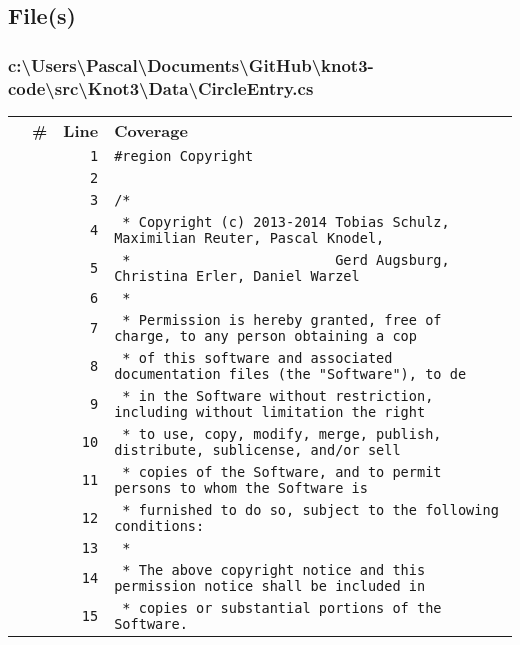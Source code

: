 \documentclass[a4paper,10pt]{article}
\begin{document}
\subsection{File(s)}
\subsubsection{c:\textbackslash Users\textbackslash Pascal\textbackslash Documents\textbackslash GitHub\textbackslash knot3-code\textbackslash src\textbackslash Knot3\textbackslash Data\textbackslash CircleEntry.cs}
\begin{longtable}[l]{lrrl}
\textbf{} & \textbf{\#} & \textbf{Line} & \textbf{Coverage}\\
\cellcolor{gray} &  & \verb~1~ & \verb~#region Copyright~\\
\cellcolor{gray} &  & \verb~2~ & \verb~~\\
\cellcolor{gray} &  & \verb~3~ & \verb~/*~\\
\cellcolor{gray} &  & \verb~4~ & \verb~ * Copyright (c) 2013-2014 Tobias Schulz, Maximilian Reuter, Pascal Knodel,~\\
\cellcolor{gray} &  & \verb~5~ & \verb~ *                         Gerd Augsburg, Christina Erler, Daniel Warzel~\\
\cellcolor{gray} &  & \verb~6~ & \verb~ *~\\
\cellcolor{gray} &  & \verb~7~ & \verb~ * Permission is hereby granted, free of charge, to any person obtaining a cop~\\
\cellcolor{gray} &  & \verb~8~ & \verb~ * of this software and associated documentation files (the "Software"), to de~\\
\cellcolor{gray} &  & \verb~9~ & \verb~ * in the Software without restriction, including without limitation the right~\\
\cellcolor{gray} &  & \verb~10~ & \verb~ * to use, copy, modify, merge, publish, distribute, sublicense, and/or sell~\\
\cellcolor{gray} &  & \verb~11~ & \verb~ * copies of the Software, and to permit persons to whom the Software is~\\
\cellcolor{gray} &  & \verb~12~ & \verb~ * furnished to do so, subject to the following conditions:~\\
\cellcolor{gray} &  & \verb~13~ & \verb~ *~\\
\cellcolor{gray} &  & \verb~14~ & \verb~ * The above copyright notice and this permission notice shall be included in ~\\
\cellcolor{gray} &  & \verb~15~ & \verb~ * copies or substantial portions of the Software.~\\

\end{longtable}
\end{document}
